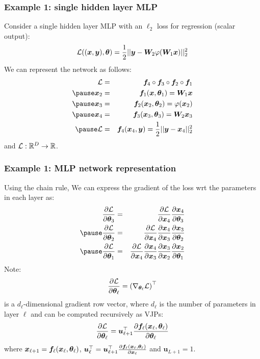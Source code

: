 \documentclass[smaller]{beamer}
\begin{document}
\begin{frame}
  \frametitle{Example 1: single hidden layer MLP}\pause

  Consider a single hidden layer MLP with an $\ell_2$ loss for regression (scalar output):\pause
  \begin{equation}
    \mathcal{L}((\bm x, \bm y),\bm{\theta}) = \frac12 ||\bm y - \bm W_2\varphi(\bm W_1\bm x)||_2^2
  \end{equation}
  \pause
  We can represent the network as follows:\pause
  \begin{eqnarray}
    \mc L &=& \bm f_4 \circ \bm f_3 \circ \bm f_2 \circ \bm f_1  \\\pause
    \bm x_2 &=& \bm f_1(\bm x, \bm\th_1) = \bm W_1 \bm x \\\pause
    \bm x_3 &=& \bm f_2(\bm x_2, \bm\th_2) = \varphi(\bm x_2) \\\pause
    \bm x_4 &=& \bm f_3(\bm x_3, \bm\th_3) = \bm W_2 \bm x_3 \\\pause
    \mc L &=& \bm f_4(\bm x_4, \bm y) = \fr12||\bm y - \bm x_4||_2^2
  \end{eqnarray}
  and $\mathcal L : \mathbb{R}^D \to \mathbb{R}$.
\end{frame}
\begin{frame}
  \frametitle{Example 1: MLP network representation}\pause

  Using the chain rule, We can express the gradient of the loss wrt the parameters in each layer as:\pause
  \begin{eqnarray}
    \pd{\mc L}{\bm\th_3} &=& \pd{\mc L}{\bm x_4} \pd{\bm x_4}{\bm\th_3} \\\pause
    \pd{\mc L}{\bm\th_2} &=& \pd{\mc L}{\bm x_4} \pd{\bm x_4}{\bm x_3} \pd{\bm x_3}{\bm\th_2} \\ \pause
    \pd{\mc L}{\bm\th_1} &=& \pd{\mc L}{\bm x_4} \pd{\bm x_4}{\bm x_3} \pd{\bm x_3}{\bm x_2} \pd{\bm x_2}{\bm\th_1}
  \end{eqnarray}
  \pause
  Note:
  \begin{equation}
    \frac{\partial{\mathcal L}}{\partial{\bm{\theta}_\ell}} = \left(\nabla_{\bm{\theta}_\ell} \mathcal L\right)^{\top}
  \end{equation}
  is a $d_\ell$-dimensional gradient row vector, where $d_\ell$ is the number of parameters in layer $\ell$ \pause and can be computed recursively as VJPs:
  \begin{equation}
    \frac{\partial{\mathcal L}}{\partial{\bm{\theta}_\ell}} = \bm u_{\ell+1}^{\top} \frac{\partial{\bm f_\ell(\bm x_\ell, \bm{\theta}_\ell)}}{\partial{\bm{\theta}_\ell}}
  \end{equation}
  where $\bm x_{\ell+1} = \bm f_\ell(\bm x_\ell, \bm{\theta}_\ell)$, $\bm u_{\ell}^{\top} = \bm u_{\ell+1}^{\top}\frac{\partial{\bm f_\ell(\bm x_\ell, \bm{\theta}_\ell)}}{\partial{\bm x_{\ell}}}$ and $\bm u_{L+1} = 1$.
\end{frame}
\end{document}

